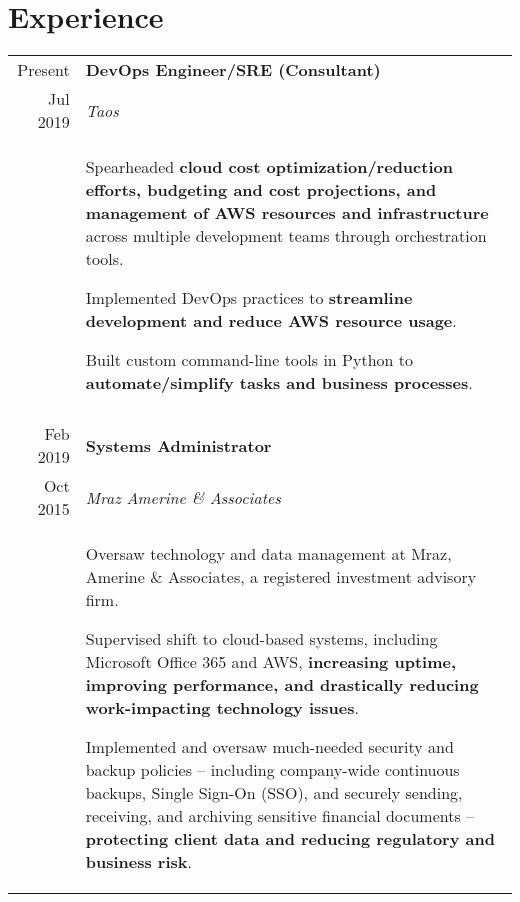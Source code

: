 \documentclass[10pt]{article}
\newcommand{\afterlistspace}[0]{\vspace{-1.5em}}
\begin{document}
\section{Experience}

\begin{tabular}{r|p{16cm}}
    Present & \textbf{DevOps Engineer/SRE (Consultant)}
    \\
    Jul 2019 & \emph{Taos}
    \\
    & \begin{itemize}
        \footnotesize{
            \item Spearheaded \textbf{cloud cost optimization/reduction efforts, budgeting and cost projections, and management of AWS resources and infrastructure} across multiple development teams through orchestration tools.
            
            \item Implemented DevOps practices to \textbf{streamline development and reduce AWS resource usage}.
            
            \item Built custom command-line tools in Python to \textbf{automate/simplify tasks and business processes}.
            
        }
        \afterlistspace
    \end{itemize}
    
    \\
    \multicolumn{2}{c}{}
    \\

    Feb 2019 & \textbf{Systems Administrator}
    \\
    Oct 2015 & \emph{Mraz Amerine \& Associates}
    \\
    & \begin{itemize}
        \footnotesize{
            \item Oversaw technology and data management at Mraz, Amerine \& Associates, a registered investment advisory firm.
            
            \item Supervised shift to cloud-based systems, including Microsoft Office 365 and AWS, \textbf{increasing uptime, improving performance, and drastically reducing work-impacting technology issues}.
            
            \item Implemented and oversaw much-needed security and backup policies -- including company-wide continuous backups, Single Sign-On (SSO), and securely sending, receiving, and archiving sensitive financial documents -- \textbf{protecting client data and reducing regulatory and business risk}.

}
\end{itemize}
\end{tabular}
\end{document}
